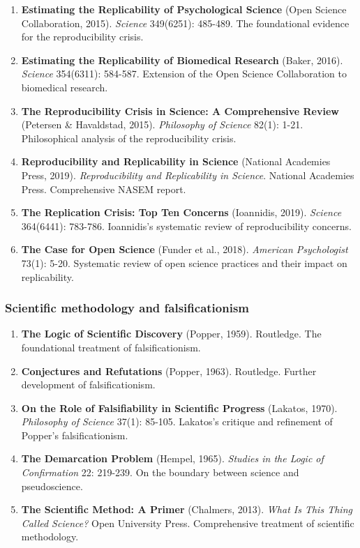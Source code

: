 \documentclass[
]{article}
\begin{document}
\begin{enumerate}
\def\labelenumi{\arabic{enumi}.}
\setcounter{enumi}{4}
\item
  \textbf{Estimating the Replicability of Psychological Science} (Open
  Science Collaboration, 2015). \emph{Science} 349(6251): 485-489. The
  foundational evidence for the reproducibility crisis.
\item
  \textbf{Estimating the Replicability of Biomedical Research} (Baker,
  2016). \emph{Science} 354(6311): 584-587. Extension of the Open
  Science Collaboration to biomedical research.
\item
  \textbf{The Reproducibility Crisis in Science: A Comprehensive Review}
  (Petersen \& Havaldstad, 2015). \emph{Philosophy of Science} 82(1):
  1-21. Philosophical analysis of the reproducibility crisis.
\item
  \textbf{Reproducibility and Replicability in Science} (National
  Academies Press, 2019). \emph{Reproducibility and Replicability in
  Science}. National Academies Press. Comprehensive NASEM report.
\item
  \textbf{The Replication Crisis: Top Ten Concerns} (Ioannidis, 2019).
  \emph{Science} 364(6441): 783-786. Ioannidis's systematic review of
  reproducibility concerns.
\item
  \textbf{The Case for Open Science} (Funder et al., 2018).
  \emph{American Psychologist} 73(1): 5-20. Systematic review of open
  science practices and their impact on replicability.
\end{enumerate}

\subsubsection{Scientific methodology and
falsificationism}\label{scientific-methodology-and-falsificationism}

\begin{enumerate}
\def\labelenumi{\arabic{enumi}.}
\setcounter{enumi}{10}
\item
  \textbf{The Logic of Scientific Discovery} (Popper, 1959). Routledge.
  The foundational treatment of falsificationism.
\item
  \textbf{Conjectures and Refutations} (Popper, 1963). Routledge.
  Further development of falsificationism.
\item
  \textbf{On the Role of Falsifiability in Scientific Progress}
  (Lakatos, 1970). \emph{Philosophy of Science} 37(1): 85-105. Lakatos's
  critique and refinement of Popper's falsificationism.
\item
  \textbf{The Demarcation Problem} (Hempel, 1965). \emph{Studies in the
  Logic of Confirmation} 22: 219-239. On the boundary between science
  and pseudoscience.
\item
  \textbf{The Scientific Method: A Primer} (Chalmers, 2013). \emph{What
  Is This Thing Called Science?} Open University Press. Comprehensive
  treatment of scientific methodology.
\end{enumerate}
\end{document}
